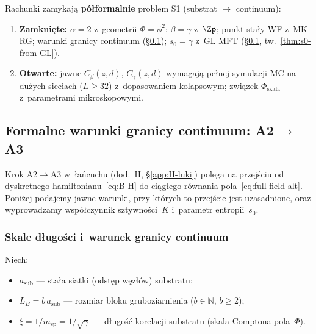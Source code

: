 \begin{remark}\label{rem:B-open}
Rachunki zamykaj\k{a} \textbf{p\'o\l{}formalnie}
problem S1 (substrat $\to$ continuum):
\begin{enumerate}[nosep]
  \item \textbf{Zamkni\k{e}te:} $\alpha = 2$ z~geometrii
    $\Phi = \phi^2$; $\beta = \gamma$ z~$\Zp$;
    punkt sta\l{}y WF z~MK-RG; warunki granicy continuum
    (\S\ref{app:B-continuum}); $s_0 = \gamma$ z~GL MFT
    (\S\ref{app:B-continuum}, tw.~\ref{thm:s0-from-GL}).
  \item \textbf{Otwarte:} jawne $C_\beta(z, d)$,
    $C_\gamma(z, d)$ wymagaj\k{a} pe\l{}nej symulacji MC
    na du\.zych sieciach ($L \geq 32$) z~dopasowaniem
    kolapsowym; zwi\k{a}zek $\Phi_{\mathrm{skala}}$
    z~parametrami mikro\-skopowymi.
\end{enumerate}
\end{remark}

\subsection{Formalne warunki granicy continuum: A2\,$\to$\,A3}%
\label{app:B-continuum}

Krok A2$\to$A3 w~\l{}a\'ncuchu (dod.~H, \S\ref{app:H-luki}) polega
na przej\'sciu od dyskretnego hamiltonianu~\eqref{eq:B-H}
do ci\k{a}g\l{}ego r\'ownania pola~\eqref{eq:full-field-alt}.
Poni\.zej podajemy jawne warunki, przy kt\'orych to przej\'scie
jest uzasadnione, oraz wyprowadzamy wsp\'o\l{}czynnik
sztywno\'sci~$K$ i~parametr entropii~$s_0$.

\subsubsection{Skale d\l{}ugo\'sci i~warunek granicy
  continuum}\label{app:B-scales}

Niech:
\begin{itemize}[nosep]
  \item $a_{\mathrm{sub}}$ --- sta\l{}a siatki (odst\k{e}p
    w\k{e}z\l{}\'ow) substratu;
  \item $L_B = b\,a_{\mathrm{sub}}$ --- rozmiar bloku
    gruboziarnienia ($b \in \mathbb{N}$, $b \geq 2$);
  \item $\xi = 1/m_{\mathrm{sp}} = 1/\sqrt{\gamma}$ ---
    d\l{}ugo\'s\'c korelacji substratu (skala Comptona pola~$\Phi$).
\end{itemize}

